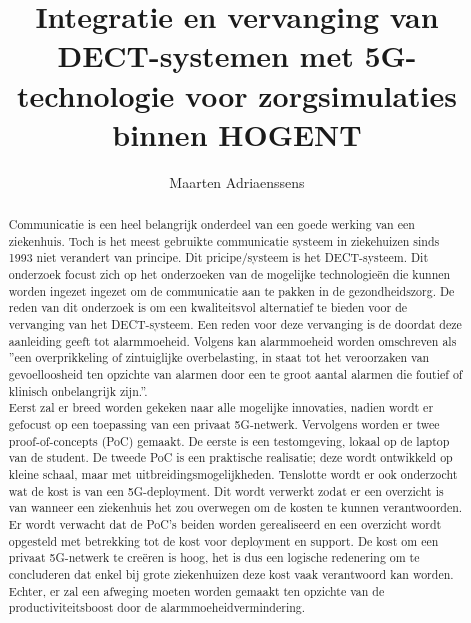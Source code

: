 \documentclass{hogent-article}
\title{Integratie en vervanging van DECT-systemen met 5G-technologie voor zorgsimulaties binnen HOGENT}
\author{Maarten Adriaenssens}
\begin{document}
\begin{abstract}
    Communicatie is een heel belangrijk onderdeel van een goede werking van een ziekenhuis. Toch is het meest gebruikte communicatie systeem in ziekehuizen sinds 1993 niet verandert van principe. Dit pricipe/systeem is het DECT-systeem. Dit onderzoek focust zich op het onderzoeken van de mogelijke technologieën die kunnen worden ingezet ingezet om de communicatie aan te pakken in de gezondheidszorg. De reden van dit onderzoek is om een kwaliteitsvol alternatief te bieden voor de vervanging van het DECT-systeem. Een reden voor deze vervanging is de doordat deze aanleiding geeft tot alarmmoeheid.
    Volgens \textcite{Ferrara2023} kan alarmmoeheid worden omschreven als ''een overprikkeling of zintuiglijke overbelasting, in staat tot het veroorzaken van gevoelloosheid ten opzichte van alarmen door een te groot aantal alarmen die foutief of klinisch onbelangrijk zijn.''.\\ Eerst zal er breed worden gekeken naar alle mogelijke innovaties, nadien wordt er gefocust op een toepassing van een privaat 5G-netwerk. 
    Vervolgens worden er twee proof-of-concepts (PoC) gemaakt. De eerste is een testomgeving, lokaal op de laptop van de student. De tweede PoC is een praktische realisatie; deze wordt ontwikkeld op kleine schaal, maar met uitbreidingsmogelijkheden. Tenslotte wordt er ook onderzocht wat de kost is van een 5G-deployment. Dit wordt verwerkt zodat er een overzicht is van wanneer een ziekenhuis het zou overwegen om de kosten te kunnen verantwoorden.\\
    Er wordt verwacht dat de PoC's beiden worden gerealiseerd en een overzicht wordt opgesteld met betrekking tot de kost voor deployment en support. De kost om een privaat 5G-netwerk te creëren is hoog, het is dus een logische redenering om te concluderen dat enkel bij grote ziekenhuizen deze kost vaak verantwoord kan worden. Echter, er zal een afweging moeten worden gemaakt ten opzichte van de productiviteitsboost door de alarmmoeheidvermindering.
\end{abstract}

\tableofcontents



\printbibliography[heading=bibintoc]
\end{document}
